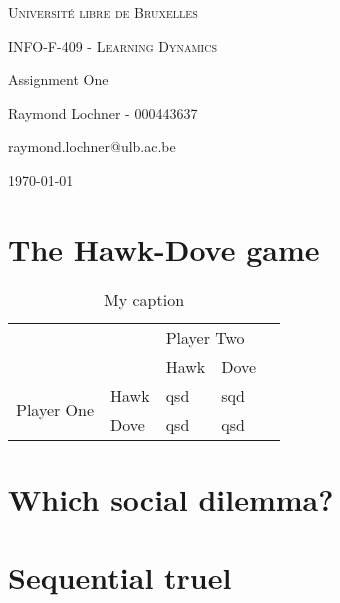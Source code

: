 \documentclass[a4paper, 11pt]{article}
\date{\today}
\begin{document}
\begin{titlepage}
	\centering
	{\scshape\LARGE Université libre de Bruxelles \par}
	\vspace{1cm}
	{\scshape\Large INFO-F-409 - Learning Dynamics\par}
	\vspace{1.5cm}
	{\huge\bfseries {Assignment One\par}}
	\vspace{2cm}
	{\Large Raymond Lochner - 000443637\par}
	\vspace{0.5cm}
	{\Large raymond.lochner@ulb.ac.be}
	\vfill
	
	\tableofcontents

\vfill
	{\large \today \par}
\end{titlepage}

\newpage

\section{The Hawk-Dove game}

\begin{table}[H]
\centering
\caption{My caption}
\label{my-label}
\begin{tabular}{ll|l|l|l}
\cline{3-4}
                                                  &      & \multicolumn{2}{l|}{Player Two} &  \\ \cline{3-4}
                                                  &      & Hawk           & Dove           &  \\ \cline{1-4}
\multicolumn{1}{|l|}{\multirow{2}{*}{Player One}} & Hawk & qsd            & sqd            &  \\ \cline{2-4}
\multicolumn{1}{|l|}{}                            & Dove & qsd            & qsd            &  \\ \cline{1-4}
\end{tabular}
\end{table}

\section{Which social dilemma?}

\section{Sequential truel}
\end{document}
